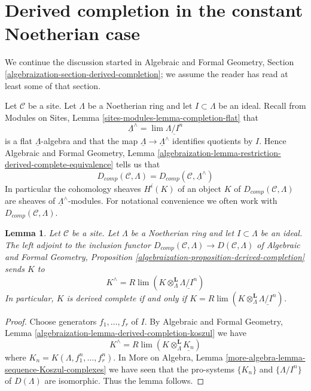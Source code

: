 \documentclass{stacks-project}
\theoremstyle{plain}
\newtheorem{lemma}[subsection]{Lemma}
\theoremstyle{definition}
\theoremstyle{remark}
\numberwithin{equation}{subsection}
\def\lim{\mathop{\mathrm{lim}}\nolimits}
\begin{document}
\section{Derived completion in the constant Noetherian case}
\label{section-derived-completion-noetherian}

\noindent
We continue the discussion started in Algebraic and Formal Geometry, Section
\ref{algebraization-section-derived-completion};
we assume the reader has read at least some of that section.

\medskip\noindent
Let $\mathcal{C}$ be a site. Let $\Lambda$ be a Noetherian ring
and let $I \subset \Lambda$ be an ideal. Recall from
Modules on Sites, Lemma \ref{sites-modules-lemma-completion-flat}
that
$$
\underline{\Lambda}^\wedge = \lim \underline{\Lambda/I^n}
$$
is a flat $\underline{\Lambda}$-algebra and that the map
$\underline{\Lambda} \to \underline{\Lambda}^\wedge$ identifies
quotients by $I$. Hence
Algebraic and Formal Geometry, Lemma
\ref{algebraization-lemma-restriction-derived-complete-equivalence}
tells us that
$$
D_{comp}(\mathcal{C}, \Lambda) =
D_{comp}(\mathcal{C}, \underline{\Lambda}^\wedge)
$$
In particular the cohomology sheaves $H^i(K)$ of an object $K$ of
$D_{comp}(\mathcal{C}, \Lambda)$ are sheaves of
$\underline{\Lambda}^\wedge$-modules.
For notational convenience we often work with
$D_{comp}(\mathcal{C}, \Lambda)$.

\begin{lemma}
\label{lemma-naive-completion}
Let $\mathcal{C}$ be a site. Let $\Lambda$ be a Noetherian ring
and let $I \subset \Lambda$ be an ideal. The left adjoint
to the inclusion functor
$D_{comp}(\mathcal{C}, \Lambda) \to D(\mathcal{C}, \Lambda)$
of Algebraic and Formal Geometry, Proposition
\ref{algebraization-proposition-derived-completion} sends $K$ to
$$
K^\wedge = R\lim(K \otimes_\Lambda^\mathbf{L} \underline{\Lambda/I^n})
$$
In particular, $K$ is derived complete if and only if
$K = R\lim(K \otimes_\Lambda^\mathbf{L} \underline{\Lambda/I^n})$.
\end{lemma}

\begin{proof}
Choose generators $f_1, \ldots, f_r$ of $I$. By
Algebraic and Formal Geometry, Lemma
\ref{algebraization-lemma-derived-completion-koszul}
we have
$$
K^\wedge = 
R\lim (K \otimes_\Lambda^\mathbf{L} \underline{K_n})
$$
where $K_n = K(\Lambda, f_1^n, \ldots, f_r^n)$.
In More on Algebra, Lemma \ref{more-algebra-lemma-sequence-Koszul-complexes}
we have seen that the pro-systems $\{K_n\}$ and
$\{\Lambda/I^n\}$ of $D(\Lambda)$
are isomorphic. Thus the lemma follows.
\end{proof}
\end{document}
